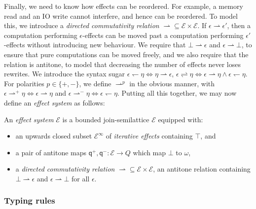 \documentclass[acmsmall,screen,anonymous,review]{acmart}
\newcommand{\mc}[1]{\ensuremath{\mathcal{#1}}}
\newcommand{\ms}[1]{\ensuremath{\mathsf{#1}}}
\newcommand{\rightmove}{\rightharpoonup}
\newcommand{\leftmove}{\leftharpoondown}
\newcommand{\slides}{\rightleftharpoons}
\newcommand{\topq}{\omega}
\newcommand{\alquant}{\ms{q}}
\begin{document}
Finally, we need to know how effects can be reordered. For example, a memory read and an IO write
cannot interfere,  and hence
can be reordered. To model this, we introduce a \emph{directed commutativity
relation} $\rightmove \subseteq \mc{E} \times \mc{E}$. If $\epsilon
\rightmove \epsilon'$, then a computation performing $\epsilon$-effects can be moved past a
computation performing $\epsilon'$-effects without introducing new behaviour. We require that $\bot
\rightmove \epsilon$ and $\epsilon \rightmove \bot$, to ensure that pure computations can be moved
freely, and we also require that the relation is antitone, to model that decreasing the number of
effects never loses rewrites. 
%
We introduce the syntax sugar $\epsilon \leftmove \eta \iff \eta \rightmove \epsilon$, $\epsilon
\slides \eta \iff \epsilon \rightmove \eta \land \epsilon \leftmove \eta$. For polarities $p \in
\{+, -\}$, we define $\rightmove^p$ in the obvious manner, with $\epsilon \rightmove^+ \eta \iff
\epsilon \rightmove \eta$ and $\epsilon \rightmove^- \eta \iff \epsilon \leftmove \eta$.
%
Putting all this together, we may now define an \emph{effect system} as follows:
\begin{definition}
  An \emph{effect system} $\mc{E}$ is a bounded join-semilattice $\mc{E}$
  equipped with:
  \begin{itemize}
  \item an upwards closed subset $\mc{E}^\infty$ of \emph{iterative effects} containing $\top$, and
  \item a pair of antitone maps $\alquant^+, \alquant^- : \mc{E} \to Q$ which map $\bot$ to $\topq$,
  \item a \emph{directed commutativity relation} $\rightmove \subseteq \mc{E} \times \mc{E}$,
  an antitone relation containing $\bot \rightmove \epsilon$ and $\epsilon \rightmove \bot$ for all $\epsilon$. 
  \end{itemize}

\end{definition}


\subsubsection{Typing rules}
\end{document}
